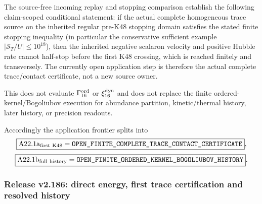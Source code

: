\documentclass[12pt,a4paper]{article}
\begin{document}
\begin{corollary}
\label{p8:cor:v2185-c06-first-k48-split}
The source-free incoming replay and stopping comparison establish the following
claim-scoped conditional statement: if the actual complete homogeneous trace
source on the inherited regular pre-K48 stopping domain satisfies the stated
finite stopping inequality (in particular the conservative sufficient example
$|\mathcal S_T/U|\le10^{18}$), then the inherited negative scalaron velocity
and positive Hubble rate cannot half-stop before the first K48 crossing, which
is reached finitely and transversely.  The currently open application step is
therefore the actual complete trace/contact certificate, not a new source
owner.

This does not evaluate $\Gamma_{16}^{\rm ord}$ or $\xi_{16}^{\rm dyn}$ and
does not replace the finite ordered-kernel/\allowbreak Bogoliubov execution for abundance
partition, kinetic/thermal history, later history, or precision readouts.

Accordingly the application frontier splits into
\[
 \boxed{\mathrm{A22.1a}_{\rm first\ K48}
 =\texttt{OPEN\_FINITE\_COMPLETE\_TRACE\_CONTACT\_CERTIFICATE}},
\]
\[
 \boxed{\mathrm{A22.1b}_{\rm full\ history}
 =\texttt{OPEN\_FINITE\_ORDERED\_KERNEL\_BOGOLIUBOV\_HISTORY}}.
\]
\end{corollary}


\subsubsection{Release v2.186: direct energy, first trace certification and resolved history}
\label{p8:sec:v2186-c06-claim-scoped-execution}
\end{document}
